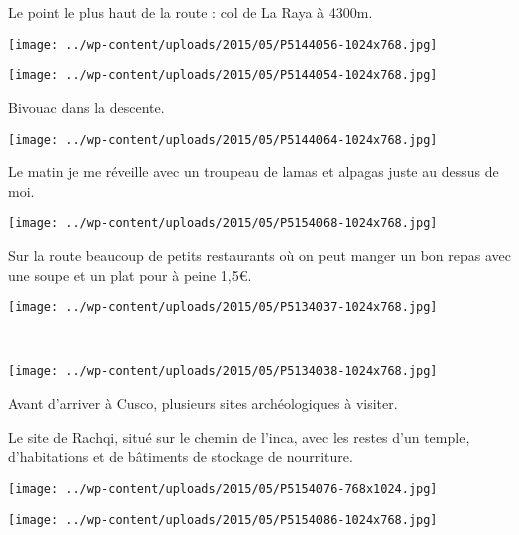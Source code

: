 Le point le plus haut de la route : col de La Raya à 4300m. 
\begin{center} \texttt{[image: ../wp-content/uploads/2015/05/P5144056-1024x768.jpg]} \end{center}
\begin{center} \texttt{[image: ../wp-content/uploads/2015/05/P5144054-1024x768.jpg]} \end{center}
\vspace{-\topsep}
\vspace{-3.25mm}
\pagebreak

Bivouac dans la descente. \\
\begin{center} \texttt{[image: ../wp-content/uploads/2015/05/P5144064-1024x768.jpg]} \end{center}

Le matin je me réveille avec un troupeau de lamas et alpagas juste au dessus de moi. 
\begin{center} \texttt{[image: ../wp-content/uploads/2015/05/P5154068-1024x768.jpg]} \end{center}
\vspace{-\topsep}
\pagebreak

Sur la route beaucoup de petits restaurants où on peut manger un bon repas avec une soupe et un plat pour à peine 1,5€. 
\begin{center} \texttt{[image: ../wp-content/uploads/2015/05/P5134037-1024x768.jpg]} \end{center}
~\\
\begin{center} \texttt{[image: ../wp-content/uploads/2015/05/P5134038-1024x768.jpg]} \end{center}
\vspace{-\topsep}
\pagebreak

Avant d'arriver à Cusco, plusieurs sites archéologiques à visiter.

Le site de Rachqi, situé sur le chemin de l'inca, avec les restes d'un temple, d'habitations et de bâtiments de stockage de nourriture. 
\begin{center} \texttt{[image: ../wp-content/uploads/2015/05/P5154076-768x1024.jpg]} \end{center}
\begin{center} \texttt{[image: ../wp-content/uploads/2015/05/P5154086-1024x768.jpg]} \end{center}

